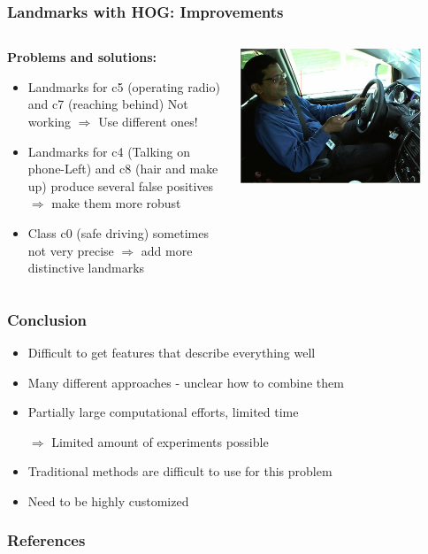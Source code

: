 \documentclass{beamer}
\begin{document}
	\begin{frame}
		\frametitle{Landmarks with HOG: Improvements}		
		\begin{columns}
			\begin{column}{0.5\textwidth}
                \textbf{Problems and solutions:}
				\begin{itemize}
					\item Landmarks for c5 (operating radio) and c7 (reaching behind) Not working $\Rightarrow$ Use different ones!
					\item Landmarks for c4 (Talking on phone-Left) and c8 (hair and make up) produce several false positives $\Rightarrow$ make them more robust
					\item Class c0 (safe driving) sometimes not very precise $\Rightarrow$ add more distinctive landmarks
				\end{itemize}
			\end{column}
			\begin{column}{0.5\textwidth}
				\begin{center}
					\includegraphics[width=0.85\textwidth]{mult_HOG/talk_phone_left}
				\end{center}
			\end{column}
		\end{columns}
		
	\end{frame}
	
	\begin{frame}
		\frametitle{Conclusion}		
		\begin{itemize}
			\item Difficult to get features that describe everything well
			\item Many different approaches - unclear how to combine them
			\item Partially large computational efforts, limited time
			\item[$\Rightarrow$] Limited amount of experiments possible
			\vspace{0.5cm}
			\item Traditional methods are difficult to use for this problem
			\item Need to be highly customized
		\end{itemize}
	\end{frame}
	
	

    
	\begin{frame}[allowframebreaks]
		\frametitle{References} 
		\nocite{*} 
		 
		 
	\end{frame}

	\medskip
\end{document}
